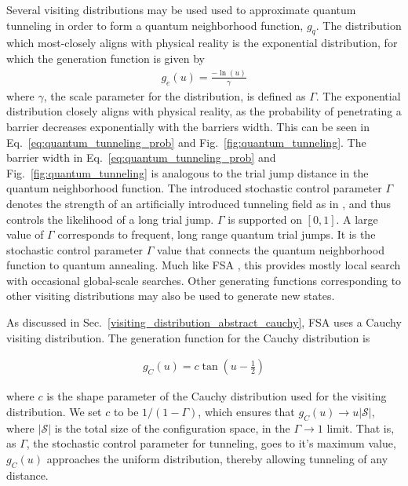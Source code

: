 \documentclass[11pt]{afthesis}
\begin{document}
	Several visiting distributions may be used used to approximate quantum tunneling in order to form a quantum neighborhood function, $g_{q}$. The distribution which most-closely aligns with physical reality is the exponential distribution, for which the generation function is given by
	\begin{align}\label{eq:exp_generation_fcn}
	g_{e}(u) =  \frac{-\ln(u)}{\gamma}
	\end{align}
	\noindent where $\gamma$, the scale parameter for the distribution, is defined as $\Gamma$. The exponential distribution closely aligns with physical reality, as the probability of penetrating a barrier decreases exponentially with the barriers width. This can be seen in Eq.~\ref{eq:quantum_tunneling_prob} and Fig.~\ref{fig:quantum_tunneling}. The barrier width in Eq.~\ref{eq:quantum_tunneling_prob} and Fig.~\ref{fig:quantum_tunneling} is analogous to the trial jump distance in the quantum neighborhood function. The introduced stochastic control parameter $\Gamma$ denotes the strength of an artificially introduced tunneling field as in \cite{mukherjee2015multivariatesearchqa}, and thus controls the likelihood of a long trial jump. $\Gamma$ is supported on $[0,1]$. A large value of $\Gamma$ corresponds to frequent, long range quantum trial jumps. It is the stochastic control parameter $\Gamma$ value that connects the quantum neighborhood function to quantum annealing. Much like FSA \cite{szu1987fastsimulatedannealing}, this provides mostly local search with occasional global-scale searches. Other generating functions corresponding to other visiting distributions may also be used to generate new states. 
	
	As discussed in Sec.~\ref{visiting_distribution_abstract_cauchy}, FSA uses a Cauchy visiting distribution. The generation function for the Cauchy distribution is
	
	\begin{align}\label{eq:cauchy_generation_fcn}
	g_{C}(u) =  c \tan\left(u-\frac{1}{2}\right)
	\end{align}
	
	\noindent where $c$ is the shape parameter of the Cauchy distribution used for the visiting distribution. We set $c$ to be $1/(1-\Gamma)$, which ensures that $g_{C}(u) \rightarrow u \left| \boldsymbol{\mathcal{S}}\right| $, where $\left| \boldsymbol{\mathcal{S}}\right|$ is the total size of the configuration space, in the $\Gamma \rightarrow 1$ limit. That is, as $\Gamma$, the stochastic control parameter for tunneling, goes to it's maximum value, $g_{C}(u)$ approaches the uniform distribution, thereby allowing tunneling of any distance.
	
\end{document}
